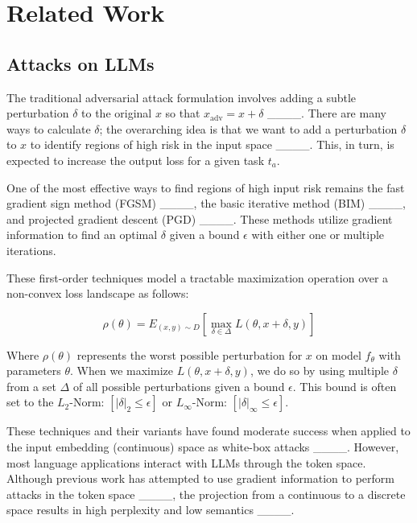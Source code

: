 \section{Related Work}
\vspace{-0em} %
\subsection{Attacks on LLMs}
\vspace{-0em}
The traditional adversarial attack formulation involves adding a subtle perturbation $\delta$ to the original $x$ so that $ x_{\text{adv}} = x + \delta$ ____. There are many ways to calculate $\delta$; the overarching idea is that we want to add a perturbation $\delta$ to $x$ to identify regions of high risk in the input space ____. This, in turn, is expected to increase the output loss for a given task $t_a$.

One of the most effective ways to find regions of high input risk remains the fast gradient sign method (FGSM) ____, the basic iterative method (BIM) ____, and projected gradient descent (PGD) ____. These methods utilize gradient information to find an optimal $\delta$ given a bound $\epsilon$ with either one or multiple iterations.

These first-order techniques model a tractable maximization operation over a non-convex loss landscape as follows:

\vspace{-0em} %
\begin{equation}
\rho(\theta) = E_{(x,y) \sim D} \left[ \max_{\delta \in \Delta} L(\theta, x + \delta, y) \right]
\end{equation}
\vspace{-0em} %

Where $\rho(\theta)$ represents the worst possible perturbation for $x$ on model $f_{\theta}$ with parameters $\theta$. When we maximize $ L(\theta, x + \delta, y)$, we do so by using multiple $\delta$ from a set $\Delta$ of all possible perturbations given a bound $\epsilon$. This bound is often set to the $L_2$-Norm: $[ |\delta|_2 \leq \epsilon ]$ or $L_{\infty}$-Norm: $[ |\delta|_\infty \leq \epsilon ]$.

These techniques and their variants have found moderate success when applied to the input embedding (continuous) space as white-box attacks ____. However, most language applications interact with LLMs through the token space. Although previous work has attempted to use gradient information to perform attacks in the token space ____, the projection from a continuous to a discrete space results in high perplexity and low semantics ____.

